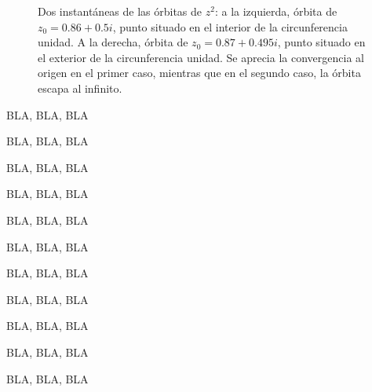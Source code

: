 \documentclass[11pt,a4paper]{article}
\begin{document}
\begin{figure}[htbp]
\begin{center}
\caption{Dos instantáneas de las órbitas de $z^2$: a la izquierda, órbita de $z_0=0.86+0.5i$, punto situado en el interior de la circunferencia unidad. A la derecha, órbita de $z_0=0.87+0.495i$, punto situado en el exterior de la circunferencia unidad. Se aprecia la convergencia al origen en el primer caso, mientras que en el segundo caso, la órbita escapa al infinito. }
\label{Fig:1}
\end{center}
\end{figure}
  
  BLA, BLA, BLA

BLA, BLA, BLA

BLA, BLA, BLA

BLA, BLA, BLA

BLA, BLA, BLA

BLA, BLA, BLA

BLA, BLA, BLA

BLA, BLA, BLA

BLA, BLA, BLA

BLA, BLA, BLA

BLA, BLA, BLA
\end{document}
